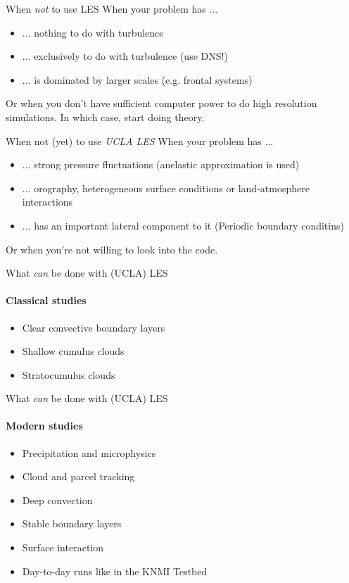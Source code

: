 \begin{frame}[<+->]{When \emph{not} to use LES}
 When your problem has ...
\begin{itemize}
 \item ... nothing to do with turbulence
 \item ... exclusively to do with turbulence (use DNS!)
 \item ... is dominated by larger scales (e.g. frontal systems)
\end{itemize}
Or when you don't have sufficient computer power to do high resolution simulations. In which case, start doing theory.
\end{frame}
\begin{frame}[<+->]{When not (yet) to use \emph{UCLA LES}}
 When your problem has ...
\begin{itemize}
 \item ... strong pressure fluctuations (anelastic approximation is used)
 \item ... orography, heterogeneous surface conditions or land-atmosphere interactions
 \item ... has an important lateral component to it (Periodic boundary conditins)
\end{itemize}
Or when you're not willing to look into the code.
\end{frame}
\begin{frame}{What \emph{can} be done with (UCLA) LES}
\framesubtitle{Classical studies}
\begin{itemize}
 \item Clear convective boundary layers
 \item Shallow cumulus clouds
 \item Stratocumulus clouds
\end{itemize}
 
\end{frame}
 \begin{frame}
  {What \emph{can} be done with (UCLA) LES}
\framesubtitle{Modern studies}
\begin{itemize}
 \item Precipitation and microphysics
 \item Cloud and parcel tracking
 \item Deep convection
 \item Stable boundary layers
 \item Surface interaction
 \item Day-to-day runs like in the KNMI Testbed
\end{itemize}
 
 \end{frame}

